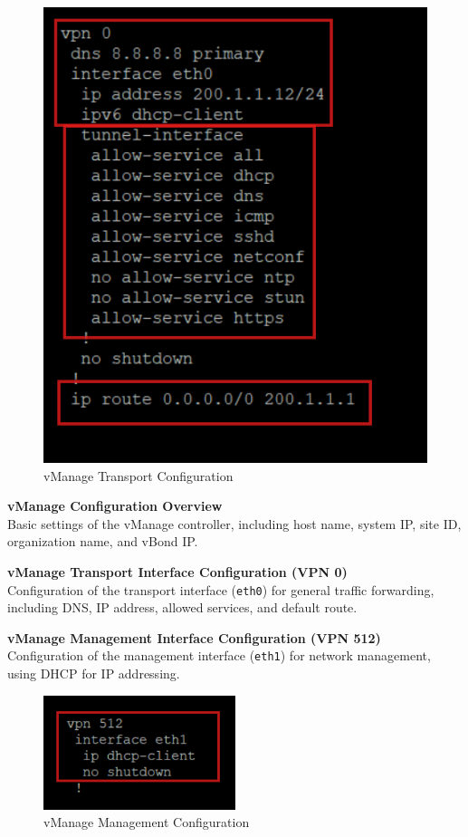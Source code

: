 \documentclass[12pt,english]{report}
\begin{document}
\begin{figure}[H]
\begin{minipage}[b]{0.30\textwidth}
        \includegraphics[width=\textwidth]{chapitre 3/19.png}
        \caption{vManage Transport Configuration}
        \label{fig:vManage Transport Configuration}
    \end{minipage}
\end{figure}
\textbf{vManage Configuration Overview} \\
Basic settings of the vManage controller, including host name, system IP, site ID, organization name, and vBond IP.

\textbf{vManage Transport Interface Configuration (VPN 0)} \\
Configuration of the transport interface (\texttt{eth0}) for general traffic forwarding, including DNS, IP address, allowed services, and default route.

\textbf{vManage Management Interface Configuration (VPN 512)} \\
    Configuration of the management interface (\texttt{eth1}) for network management, using DHCP for IP addressing.
\begin{figure}[H]
    \centering
    \includegraphics[width= 0.5\textwidth]{chapitre 3/20.png}
    \caption{vManage Management Configuration}
    \label{vManage Management Configuration}
\end{figure}
\end{document}
